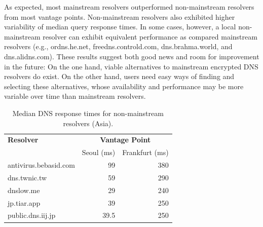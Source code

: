 As expected, most mainstream resolvers outperformed non-mainstream resolvers from most vantage points. Non-mainstream resolvers also exhibited higher variability of median query response times. In some cases, however, a local non-mainstream resolver can exhibit equivalent performance as compared mainstream resolvers (e.g., ordns.he.net, freedns.controld.com, dns.brahma.world, and dns.alidns.com). These results suggest both good news and room for improvement in the future: On the one hand, viable alternatives to mainstream encrypted DNS resolvers do exist. On the other hand, users need easy ways of finding and selecting these alternatives, whose availability and performance may be more variable over time than mainstream resolvers.

\begin{table}[t!]
\centering
\scriptsize
\begin{tabular}{l|rr}
\toprule
    \textbf{Resolver} & \multicolumn{2}{c}{\textbf{Vantage Point}} \\
                  & \textrm{Seoul (ms)}         & \textrm{Frankfurt (ms)} \\
\midrule
antivirus.bebasid.com                                & 99 & 380                            \\
dns.twnic.tw                          & 59                                          & 290                              \\
dnslow.me                                & 29                                           & 240                              \\
jp.tiar.app                            & 39                                           & 250                             \\
public.dns.iij.jp                              & 39.5                                           & 250                               \\
\bottomrule
\end{tabular}
    \caption{Median DNS response times for non-mainstream resolvers (Asia).}
\label{tab:UnconvAsia}
\end{table}

